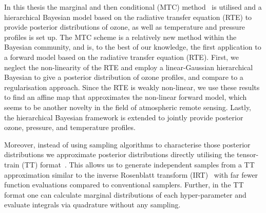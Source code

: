 In this thesis the marginal and then conditional (MTC) method~\cite{fox2016fast} is utilised and a hierarchical Bayesian model based on the radiative transfer equation (RTE) to provide posterior distributions of ozone, as well as temperature and pressure profiles is set up.
The MTC scheme is a relatively new method within the Bayesian community, and is, to the best of our knowledge, the first application to a forward model based on the radiative transfer equation (RTE).
First, we neglect the non-linearity of the RTE and employ a linear-Gaussian hierarchical Bayesian to give a posterior distribution of ozone profiles, and compare to a regularisation approach.
Since the RTE is weakly non-linear, we use these results to find an affine map that approximates the non-linear forward model, which seems to be another novelty in the field of atmospheric remote sensing.
Lastly, the hierarchical Bayesian framework is extended to jointly provide posterior ozone, pressure, and temperature profiles.

Moreover, instead of using sampling algorithms to characterise those posterior distributions we approximate posterior distributions directly utilising the tensor-train (TT) format~\cite{cui2022deep}. 
This allows us to generate independent samples from a TT approximation similar to the inverse Rosenblatt transform (IRT)~\cite{dolgov2020approximation} with far fewer function evaluations compared to conventional samplers.
Further, in the TT format one can calculate marginal distributions of each hyper-parameter and evaluate integrals via quadrature without any sampling.


